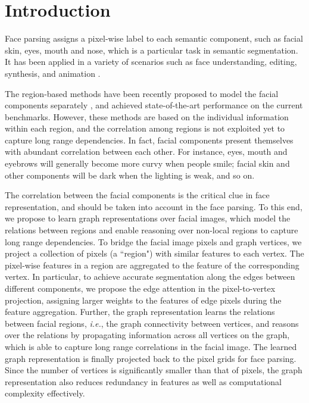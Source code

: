 \documentclass[runningheads]{llncs}
\def\ie{{\it i.e.}}
\begin{document}
\section{Introduction}

Face parsing assigns a pixel-wise label to each semantic component, such as facial skin, eyes, mouth and nose, which is a particular task in semantic segmentation. 
It has been applied in a variety of scenarios such as face understanding, editing, synthesis, and animation \cite{CelebAMask-HQ,zhang2018synthesis,zhang2016joint}.  


The region-based methods have been recently proposed to model the facial components separately \cite{lin2019face,yin2020end,liu2017face}, and achieved state-of-the-art performance on the current benchmarks. 
However, these methods are based on the individual information within each region, and the correlation among regions is not exploited yet to capture long range dependencies. 
In fact, facial components present themselves with abundant correlation between each other. 
For instance, eyes, mouth and eyebrows will generally become more curvy when people smile; facial skin and other components will be dark when the lighting is weak, and so on.





The correlation between the facial components is the critical clue in face representation, and should be taken into account in the face parsing.
To this end, we propose to learn graph representations over facial images, which model the relations between regions and enable reasoning over non-local regions to capture long range dependencies. 
To bridge the facial image pixels and graph vertices, we project a collection of pixels (a ``region") with similar features to each vertex. 
The pixel-wise features in a region are aggregated to the feature of the corresponding vertex. 
In particular, to achieve accurate segmentation along the edges between different components,  we propose the edge attention in the pixel-to-vertex projection, assigning larger weights to the features of edge pixels during the feature aggregation. 
Further, the graph representation learns the relations between facial regions, \ie, the graph connectivity between vertices, and reasons over the relations by propagating information across all vertices on the graph, which is able to capture long range correlations in the facial image. 
The learned graph representation is finally projected back to the pixel grids for face parsing. 
Since the number of vertices is significantly smaller than that of pixels, the graph representation also reduces redundancy in features as well as computational complexity effectively.
\end{document}
